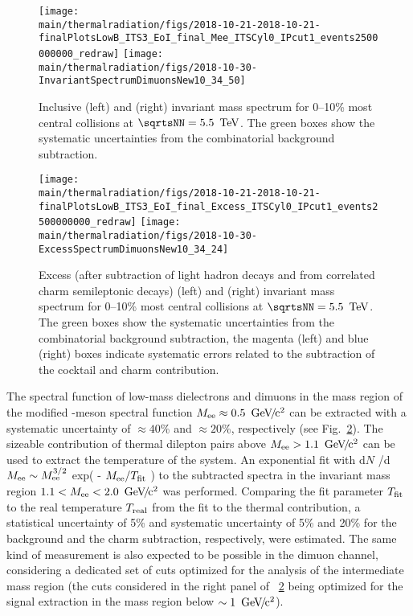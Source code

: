 \documentclass[../report.tex]{subfiles}
\providecommand{\main}{..}
\begin{document}
\begin{figure}[htb]
\centering
\texttt{[image: \\main/thermalradiation/figs/2018-10-21-2018-10-21-finalPlotsLowB\_ITS3\_EoI\_final\_Mee\_ITSCyl0\_IPcut1\_events2500000000\_redraw]}
\texttt{[image: \\main/thermalradiation/figs/2018-10-30-InvariantSpectrumDimuonsNew10\_34\_50]}
\caption{Inclusive \Pepem (left) and \PGmpGmm (right) invariant mass spectrum for 0--10\% most central \PbPb{} collisions at $\sqrtsNN = \unit[5.5]{\UTeV}$. The green boxes show the systematic uncertainties from the combinatorial background subtraction.}
\label{fig:DileptonsSpectra}
\end{figure}

\begin{figure}[htb]
\centering
\texttt{[image: \\main/thermalradiation/figs/2018-10-21-2018-10-21-finalPlotsLowB\_ITS3\_EoI\_final\_Excess\_ITSCyl0\_IPcut1\_events2500000000\_redraw]}
\texttt{[image: \\main/thermalradiation/figs/2018-10-30-ExcessSpectrumDimuonsNew10\_34\_24]}
\caption{Excess (after subtraction of light hadron decays and from correlated charm semileptonic decays) \Pepem (left) and \PGmpGmm (right) invariant mass spectrum for 0--10\% most central \PbPb{} collisions at $\sqrtsNN = \unit[5.5]{\UTeV}$. The green boxes show the systematic uncertainties from the combinatorial background subtraction, the magenta (left) and blue (right) boxes indicate systematic errors related to the subtraction of the cocktail and charm contribution.}
\label{fig:DileptonsSpectraSubtracted}
\end{figure}

The spectral function of low-mass dielectrons and dimuons in the mass region of the modified \PGr-meson spectral function $M_{\rm ee}\approx\unit[0.5]{\UGeVcc}$ can be extracted with a systematic uncertainty of $\approx 40$\% and $\approx 20$\%, respectively (see Fig.~\ref{fig:DileptonsSpectraSubtracted}). 
The sizeable contribution of thermal dilepton pairs above $M_{\rm ee}>\unit[1.1]{\UGeVcc}$ can be used to extract the temperature of the system. An exponential fit with d$N$ /d$M_{\rm ee} \sim  M_{\rm ee}^{3/2}$ exp( - $M_{\rm ee} /T_{\rm fit}$ ) to the subtracted \Pepem spectra in the invariant mass region $1.1 < M_{\rm ee} < \unit[2.0]{\UGeVcc}$ was performed. Comparing the fit parameter $T_{\rm fit}$ to the real temperature $T_{\rm real}$ from the fit to the thermal contribution, a statistical uncertainty of 5\% and systematic uncertainty of 5\% and 20\% for the background and the charm subtraction, respectively, were estimated. The same kind of measurement is also expected to be possible in the dimuon channel, considering a dedicated set of cuts optimized for the analysis of the intermediate mass region (the cuts considered in the right panel of \figurename~\ref{fig:DileptonsSpectraSubtracted} being optimized for the signal extraction in the mass region below $\sim \unit[1]{\UGeVcc}$).
\end{document}
